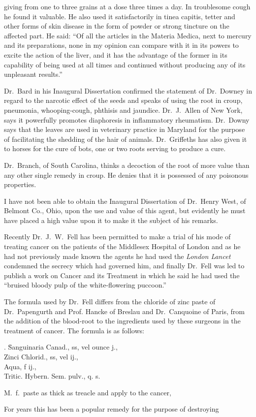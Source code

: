 giving from one to three grains at a dose three times a day. In
troublesome cough he found it valuable. He also used it satisfactorily
in tinea capitis, tetter and other forms of skin disease in the form of
powder or strong tincture on the affected part. He said: ``Of all
the articles in the Materia Medica, next to mercury and its preparations,
none in my opinion can compare with it in its powers to excite the
action of the liver, and it has the advantage of the former in its capability
of being used at all times and continued without producing any
of its unpleasant results.''

Dr.\ Bard in his Inaugural Dissertation confirmed the statement of
Dr.\ Downey in regard to the narcotic effect of the seeds and speaks
of using the root in croup, pneumonia, whooping-cough, phthisis and
jaundice. Dr.\ J.\ Allen of New York, says it powerfully promotes diaphoresis
in inflammatory rheumatism. Dr.\ Downy says that the leaves
are used in veterinary practice in Maryland for the purpose of facilitating
the shedding of the hair of animals. Dr.\ Griffeths has also given it to
horses for the cure of bots, one or two roots serving to produce a cure.

Dr.\ Branch, of South Carolina, thinks a decoction of the root of
more value than any other single remedy in croup. He denies that it
is possessed of any poisonous properties.

I have not been able to obtain the Inaugural Dissertation of Dr.\ Henry
West, of Belmont Co., Ohio, upon the use and value of this
agent, but evidently he must have placed a high value upon it to make
it the subject of his remarks.

Recently Dr.\ J.\ W.\ Fell has been permitted to make a trial of his
mode of treating cancer on the patients of the Middlesex Hospital of London
and as he had not previously made known the agents he had used
the \emph{London Lancet} condemned the secrecy which had governed him, and
finally Dr.\ Fell was led to publish a work on Cancer and its Treatment
in which he said he had used the ``bruised bloody pulp of the white-flowering
puccoon.''

The formula used by Dr.\ Fell differs from the chloride of zinc
paste of Dr.\ Papengurth and Prof. Hancke of Breslau and Dr.\ Canquoine
of Paris, from the addition of the blood-root to the ingredients used by
these surgeons in the treatment of cancer.   The formula is as follows:

\begin{center}
\begin{tabbing}
  \prescription. \= Sanguinaria Canad., \ounce ss, vel ounce j., \\
    \> Zinci Chlorid., \ounce ss, vel \ounce ij., \\
    \> Aqua, f \ounce ij., \\
    \> Tritic. Hybern. Sem. pulv., q. s.
\end{tabbing}
\end{center}
M.\ f.\ paste as thick as treacle and apply to the cancer,

For years this has been a popular remedy for the purpose of destroying\endinput
